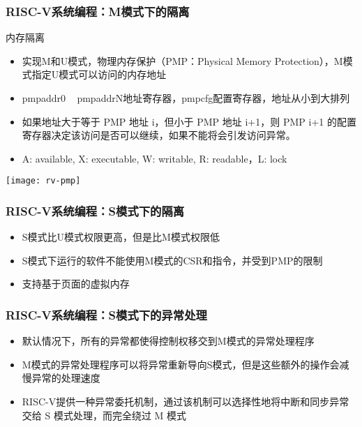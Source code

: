 \begin{frame}
    \frametitle{RISC-V系统编程：M模式下的隔离}
    内存隔离
    \begin{itemize}
        \item 实现M和U模式，物理内存保护（PMP：Physical Memory Protection），M模式指定U模式可以访问的内存地址
        \item pmpaddr0 ~ pmpaddrN地址寄存器，pmpcfg配置寄存器，地址从小到大排列
        \item 如果地址大于等于 PMP 地址 i，但小于 PMP 地址 i+1，则 PMP i+1 的配置寄存器决定该访问是否可以继续，如果不能将会引发访问异常。
        \item A: available, X: executable, W: writable, R: readable，L: lock
        
    \end{itemize}
    
    \centering
    \texttt{[image: rv-pmp]}
    
\end{frame}


\begin{frame}
    \frametitle{RISC-V系统编程：S模式下的隔离}
    \begin{itemize}
        \item S模式比U模式权限更高，但是比M模式权限低
        \item S模式下运行的软件不能使用M模式的CSR和指令，并受到PMP的限制
        \item 支持基于页面的虚拟内存
        
    \end{itemize}
    
\end{frame}


\begin{frame}
    \frametitle{RISC-V系统编程：S模式下的异常处理}
    \begin{itemize}
        \item 默认情况下，所有的异常都使得控制权移交到M模式的异常处理程序
        \item M模式的异常处理程序可以将异常重新导向S模式，但是这些额外的操作会减慢异常的处理速度
        \item RISC-V提供一种异常委托机制，通过该机制可以选择性地将中断和同步异常交给 S 模式处理，而完全绕过 M 模式
        
    \end{itemize}
   
    
\end{frame}

